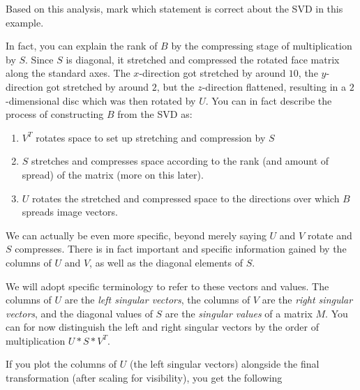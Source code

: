 \documentclass{ximera}
\begin{document}
\begin{problem}
\begin{problem}

Based on this analysis, mark which statement is correct about the SVD in this example.

\begin{multipleChoice}


\end{multipleChoice}

\begin{feedback}

  In fact, you can explain the rank of $B$ by the compressing stage of multiplication by $S$. Since $S$ is diagonal, it stretched and compressed the rotated face matrix along the standard axes. The $x$-direction got stretched by around $10$, the $y$-direction got stretched by around $2$, but the $z$-direction flattened, resulting in a $2$-dimensional disc which was then rotated by $U$. You can in fact describe the process of constructing $B$ from the SVD as: 

  \begin{enumerate}
    \item $V^T$ rotates space to set up stretching and compression by $S$
    \item $S$ stretches and compresses space according to the rank (and amount of spread) of the matrix (more on this later).
    \item $U$ rotates the stretched and compressed space to the directions over which $B$ spreads image vectors.
  \end{enumerate}

\end{feedback}

We can actually be even more specific, beyond merely saying $U$ and $V$ rotate and $S$ compresses. There is in fact important and specific information gained by the columns of $U$ and $V$, as well as the diagonal elements of $S$. 

We will adopt specific terminology to refer to these vectors and values. The columns of $U$ are the \emph{left singular vectors}, the columns of $V$ are the \emph{right singular vectors}, and the diagonal values of $S$ are the \emph{singular values} of a matrix $M$. You can for now distinguish the left and right singular vectors by the order of multiplication $U*S*V^T$.

If you plot the columns of $U$ (the left singular vectors) alongside the final transformation (after scaling for visibility), you get the following 


\end{problem}
\end{problem}
\end{document}
